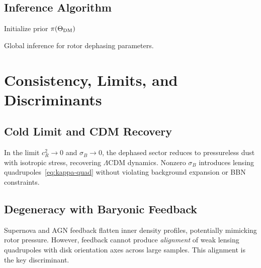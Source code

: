 \documentclass[11pt,a4paper]{article}
\numberwithin{equation}{section}
\theoremstyle{plain}
\theoremstyle{definition}
\theoremstyle{remark}
\begin{document}
\subsection{Inference Algorithm}

\begin{algorithm}[H]
\DontPrintSemicolon
{}
Initialize prior $\pi(\Theta_{\rm DM})$\;
\caption{Global inference for rotor dephasing parameters.}
\end{algorithm}

\vspace{1em}

\section{Consistency, Limits, and Discriminants}\label{sec:discriminants}

\subsection{Cold Limit and CDM Recovery}

In the limit $c_R^2\to 0$ and $\sigma_B\to 0$, the dephased sector reduces to pressureless dust with isotropic stress, recovering $\Lambda$CDM dynamics. Nonzero $\sigma_B$ introduces lensing quadrupoles~\eqref{eq:kappa-quad} without violating background expansion or BBN constraints.

\subsection{Degeneracy with Baryonic Feedback}

Supernova and AGN feedback flatten inner density profiles, potentially mimicking rotor pressure. However, feedback cannot produce \emph{alignment} of weak lensing quadrupoles with disk orientation axes across large samples. This alignment is the key discriminant.
\end{document}
